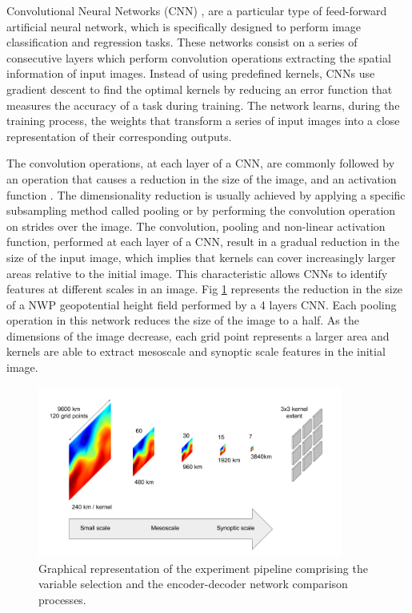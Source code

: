 \documentclass[twocol]{ametsoc}
\begin{document}
Convolutional Neural Networks (CNN) \citep{lecun2010convolutional}, are a particular type of feed-forward artificial neural network, which is specifically designed to perform image classification and regression tasks. These networks consist on a series of consecutive layers which perform convolution operations extracting the spatial information of input images. Instead of using predefined kernels, CNNs use gradient descent \citep{bottou2010large} to find the optimal kernels by reducing an error function that measures the accuracy of a task during training. The network learns, during the training process, the weights that transform a series of input images into a close representation of their corresponding outputs.

The convolution operations, at each layer of a CNN, are commonly followed by an operation that causes a reduction in the size of the image, and an activation function \citep{glorot2010understanding}. The dimensionality reduction is usually achieved by applying a specific subsampling method called pooling \citep{scherer2010evaluation} or by performing the convolution operation on strides over the image. The convolution, pooling and non-linear activation function, performed at each layer of a CNN, result in a gradual reduction in the size of the input image, which implies that kernels can cover increasingly larger areas relative to the initial image. This characteristic allows CNNs to identify features at different scales in an image. Fig \ref{cnn_scales} represents the reduction in the size of a NWP geopotential height field performed by a 4 layers CNN. Each pooling operation in this network reduces the size of the image to a half. As the dimensions of the image decrease, each grid point represents a larger area and kernels are able to extract mesoscale and synoptic scale features in the initial image. 

\begin{figure}[h]
 \centerline{\includegraphics[width=10cm]{cnn_scales.png}}
  \caption{Graphical representation of the experiment pipeline comprising the variable selection and the encoder-decoder network comparison processes.}\label{cnn_scales}
\end{figure}
\end{document}
